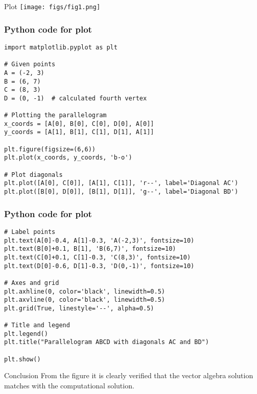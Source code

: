 \documentclass{beamer}
\begin{document}
\begin{frame}{Plot}
    \centering
    \texttt{[image: figs/fig1.png]} 
    \label{Parallelogram ABCD using vector algebra}
\end{frame}

\begin{frame}[fragile]
\frametitle{Python code for plot}
\begin{lstlisting}
import matplotlib.pyplot as plt

# Given points
A = (-2, 3)
B = (6, 7)
C = (8, 3)
D = (0, -1)  # calculated fourth vertex

# Plotting the parallelogram
x_coords = [A[0], B[0], C[0], D[0], A[0]]
y_coords = [A[1], B[1], C[1], D[1], A[1]]

plt.figure(figsize=(6,6))
plt.plot(x_coords, y_coords, 'b-o')

# Plot diagonals
plt.plot([A[0], C[0]], [A[1], C[1]], 'r--', label='Diagonal AC')
plt.plot([B[0], D[0]], [B[1], D[1]], 'g--', label='Diagonal BD')
\end{lstlisting}
\end{frame}

\begin{frame}[fragile]
\frametitle{Python code for plot}
\begin{lstlisting}
# Label points
plt.text(A[0]-0.4, A[1]-0.3, 'A(-2,3)', fontsize=10)
plt.text(B[0]+0.1, B[1], 'B(6,7)', fontsize=10)
plt.text(C[0]+0.1, C[1]-0.3, 'C(8,3)', fontsize=10)
plt.text(D[0]-0.6, D[1]-0.3, 'D(0,-1)', fontsize=10)

# Axes and grid
plt.axhline(0, color='black', linewidth=0.5)
plt.axvline(0, color='black', linewidth=0.5)
plt.grid(True, linestyle='--', alpha=0.5)

# Title and legend
plt.legend()
plt.title("Parallelogram ABCD with diagonals AC and BD")

plt.show()
\end{lstlisting}
\end{frame}

\begin{frame}{Conclusion}
From the figure it is clearly verified that the vector algebra solution matches with the computational solution.
\end{frame}
\end{document}

